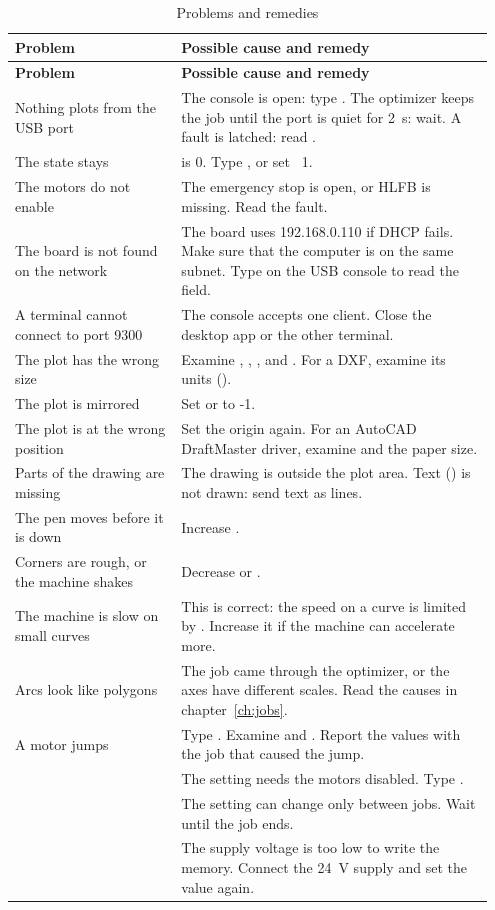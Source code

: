 \begin{longtable}{@{}P{0.33\linewidth}P{0.62\linewidth}@{}}
\caption{Problems and remedies}\label{tab:problems}\\
\toprule
\textbf{Problem} & \textbf{Possible cause and remedy} \\
\midrule
\endfirsthead
\toprule
\textbf{Problem} & \textbf{Possible cause and remedy} \\
\midrule
\endhead
\bottomrule
\endfoot
Nothing plots from the USB port & The console is open: type .
The optimizer keeps the job until the port is quiet for 2~s: wait. A fault
is latched: read . \\
The state stays  &  is 0. Type
, or set ~1. \\
The motors do not enable & The emergency stop is open, or HLFB is missing.
Read the fault. \\
The board is not found on the network & The board uses 192.168.0.110 if DHCP
fails. Make sure that the computer is on the same subnet. Type 
on the USB console to read the  field. \\
A terminal cannot connect to port 9300 & The console accepts one client. Close
the desktop app or the other terminal. \\
The plot has the wrong size & Examine , ,
, and . For a DXF, examine its units
(). \\
The plot is mirrored & Set  or  to -1. \\
The plot is at the wrong position & Set the origin again. For an AutoCAD
DraftMaster driver, examine  and the paper size. \\
Parts of the drawing are missing & The drawing is outside the plot area.
Text () is not drawn: send text as lines. \\
The pen moves before it is down & Increase . \\
Corners are rough, or the machine shakes & Decrease  or
. \\
The machine is slow on small curves & This is correct: the speed on a curve is
limited by . Increase it if the machine can accelerate more. \\
Arcs look like polygons & The job came through the optimizer, or the axes
have different scales. Read the causes in chapter~\ref{ch:jobs}. \\
A motor jumps & Type . Examine  and
. Report the values with the job that caused the jump. \\
 & The setting needs the motors disabled.
Type . \\
 & The setting can change only between jobs.
Wait until the job ends. \\
 & The supply voltage is too low to write
the memory. Connect the 24~V supply and set the value again. \\
\end{longtable}
